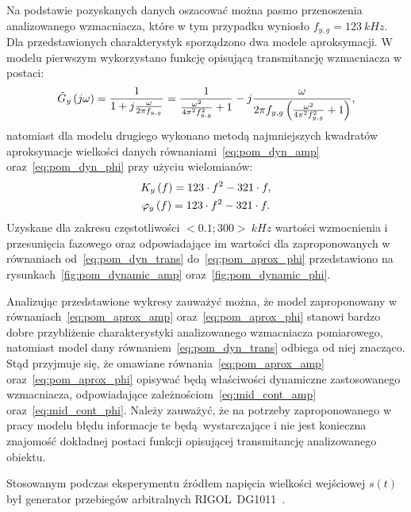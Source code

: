 Na podstawie pozyskanych danych oszacować można pasmo przenoszenia analizowanego wzmacniacza, które w tym przypadku wyniosło $f_{y,g} = \qty{123}{kHz}$. Dla przedstawionych charakterystyk sporządzono dwa modele aproksymacji. W modelu pierwszym wykorzystano funkcję opisującą transmitancję wzmacniacza w postaci:
\begin{gather}
\tilde{G}_{y} \left(j\omega\right) = \frac{1}{1 + j \frac{\omega}{2 \pi f_{y,g}}} = \frac{1}{\frac{\omega^{2}}{4 \pi^{2} f_{y,g}^{2}} + 1} - j \frac{\omega}{2 \pi f_{y,g} \left( \frac{\omega^{2}}{4 \pi^{2} f_{y,g}^{2}} + 1 \right) } \label{eq:pom_dyn_trans},
\end{gather}
natomiast dla modelu drugiego wykonano metodą najmniejszych kwadratów aproksymacje wielkości danych równaniami~\eqref{eq:pom_dyn_amp} oraz~\eqref{eq:pom_dyn_phi} przy użyciu wielomianów:
\begin{gather}
K_{y} \left(f\right) = 123 \cdot f^{2} - 321 \cdot f \label{eq:pom_aprox_amp}, \\
\varphi_{y} \left(f\right) = 123 \cdot f^{2} - 321 \cdot f \label{eq:pom_aprox_phi}.
\end{gather}
Uzyskane dla zakresu częstotliwości $<0.1;300>~\unit{kHz}$ wartości wzmocnienia i przesunięcia fazowego oraz odpowiadające im wartości dla zaproponowanych w równaniach od~\eqref{eq:pom_dyn_trans} do~\eqref{eq:pom_aprox_phi} przedstawiono na rysunkach~\ref{fig:pom_dynamic_amp} oraz~\ref{fig:pom_dynamic_phi}.

Analizując przedstawione wykresy zauważyć można, że model zaproponowany w równaniach~\eqref{eq:pom_aprox_amp} oraz~\eqref{eq:pom_aprox_phi} stanowi bardzo dobre przybliżenie charakterystyki analizowanego wzmacniacza pomiarowego, natomiast model dany równaniem~\eqref{eq:pom_dyn_trans} odbiega od niej znacząco. Stąd przyjmuje się, że omawiane równania~\eqref{eq:pom_aprox_amp} oraz~\eqref{eq:pom_aprox_phi} opisywać będą właściwości dynamiczne zastosowanego wzmacniacza, odpowiadające zależnościom~\eqref{eq:mid_cont_amp} oraz~\eqref{eq:mid_cont_phi}. Należy zauważyć, że na potrzeby zaproponowanego w pracy modelu błędu informacje te będą wystarczające i nie jest konieczna znajomość dokładnej postaci funkcji opisującej transmitancję analizowanego obiektu.

Stosowanym podczas eksperymentu źródłem napięcia wielkości wejściowej $s(t)$ był generator przebiegów arbitralnych RIGOL~DG1011~\cite{rigol_manual}.

